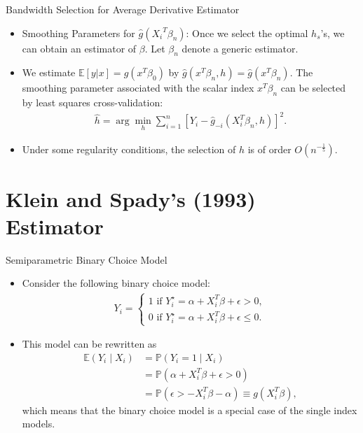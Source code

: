 \documentclass[xcolor=svgnames,dvipdfmx,cjk]{beamer}
\theoremstyle{example}
\def\E{\mathbb{E}}
\def\P{\mathbb{P}}
\begin{document}
\begin{frame}{Bandwidth Selection for Average Derivative Estimator}
\begin{itemize}
  \item \alert{Smoothing Parameters for $\hat{g}({X_i}^T\beta_n)$}: 
        Once we select the optimal $h_s$'s, we can obtain an estimator of $\beta$.
        Let $\beta_n$ denote a generic estimator.
  \item We estimate $\E[y|x] = g(x^T\beta_0)$ by $\hat{g}(x^T\beta_n, h) = \hat{g}(x^T\beta_n)$.
        The smoothing parameter associated with the scalar index $x^T \beta_n$ can be selected by least squares cross-validation:
        \begin{align*}
          \hat{h} = \arg\min_{h} \sum_{i=1}^{n} [Y_i - \hat{g}_{-i}(X_i^T\beta_n, h)]^2.
        \end{align*}
  \item Under some regularity conditions, the selection of $h$ is of order $O(n^{-\frac{1}{5}})$.
\end{itemize}
\end{frame}

 
  
\section{Klein and Spady's (1993) Estimator}
  
\begin{frame}{Semiparametric Binary Choice Model}
 \begin{itemize}
  \item Consider the following binary choice model:
        \begin{align*}
          Y_i = \left\{
            \begin{array}{l}
              1 \text{ if } Y_i^{\star} = \alpha + X_i^T \beta + \epsilon > 0, 
              \\ 
              0 \text{ if } Y_i^{\star} = \alpha + X_i^T \beta + \epsilon \leq 0.
            \end{array}
            \right.
        \end{align*}
  \item This model can be rewritten as
        \begin{align*}
          \E(Y_i \mid X_i) 
          &= \P(Y_i = 1 \mid X_i)\\
          &= \P( \alpha + X_i^T \beta + \epsilon > 0)\\
          &= \P(\epsilon > -X_i^T \beta - \alpha)
          \equiv g(X_i^T\beta),
        \end{align*}
        which means that the binary choice model is a special case of the single index models.
 \end{itemize} 
\end{frame} 
  
\end{document}
